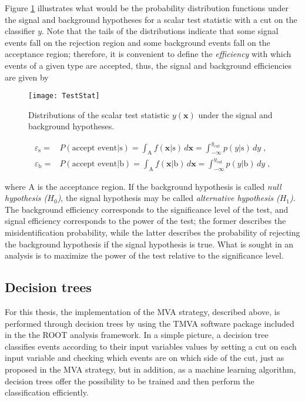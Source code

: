 Figure \ref{fig:scalar_test} illustrates what would be the probability distribution functions under the signal and background hypotheses for a scalar test statistic with a cut on the classifier $y$.
Note that the tails of the distributions indicate that some signal events fall on the rejection region and some background events fall on the acceptance region; therefore, it is convenient to define the \textit{efficiency} with which events of a given type are accepted, thus, the signal and background efficiencies are given by 

\begin{figure}[!h]
  \centering
  \texttt{[image: TestStat]}
  \caption[Scalar test statistical.]{Distributions of the scalar test statistic $y(\textbf{x})$ under the signal and background hypotheses.\cite{mva}}\label{fig:scalar_test}
\end{figure}

\begin{align}
\label{eq:sigeff}
\varepsilon_{\textrm{s}}  = & P( \mbox{accept event} | \mbox{s} ) = \int_{\textrm{A}} f(\textbf{x} | \mbox{s} ) \, d \textbf{x} = \int_{-\infty}^{y_{\textrm{cut}}} p(y | \mbox{s}) \, dy\;, \\
\varepsilon_{\textrm{b}}  = & P( \mbox{accept event} | \mbox{b} ) = \int_{\textrm{A}} f(\textbf{x} | \mbox{b} ) \, d \textbf{x} = \int_{-\infty}^{y_{\textrm{cut}}} p(y | \mbox{b}) \, dy \;,
\end{align}

\noindent where A is the acceptance region. If the background hypothesis is called \textit{null hypothesis ($H_0$)}, the signal hypothesis may be called \textit{alternative hypothesis ($H_1$)}. The background efficiency corresponds to the significance level of the test, and signal efficiency corresponds to the power of the test; the former describes the misidentification probability, while the latter describes the probability of rejecting the background hypothesis if the signal hypothesis is true. What is sought in an analysis is to maximize the power of the test relative to the significance level.

\subsection{Decision trees }

For this thesis, the implementation of the MVA strategy, described above, is performed through decision trees by using the TMVA software package \cite{tmva} included in the the ROOT analysis framework\cite{root}. In a simple picture, a decision tree classifies events according to their input variables values by setting a cut on each input variable and checking which events are on which side of the cut, just as proposed in the MVA strategy, but in addition, as a machine learning algorithm, decision trees offer the possibility to be trained and then perform the classification efficiently.   

